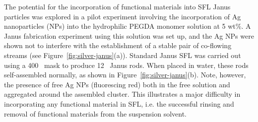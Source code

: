 The potential for the incorporation of functional materials into SFL Janus particles was 
explored in a pilot experiment involving the incorporation of Ag nanoparticles (NPs) into the
hydrophilic PEGDA monomer solution at 5 wt\%. A Janus fabrication experiment using this 
solution was set up, and the Ag NPs were shown not to interfere with the establishment of a stable
pair of co-flowing streams (see Figure~\ref{fig:silver-janus}(a)). Standard Janus SFL was carried
out using a 400 \microns~mask to produce 12 \microns~Janus rods. When placed in water, these rods
self-assembled normally, as shown in Figure~\ref{fig:silver-janus}(b).  Note, however, the presence of
free Ag NPs (fluorescing red) both in the free solution and aggregated around the assembled cluster.
This illustrates a major difficulty in incorporating any functional material in SFL, i.e. the successful 
rinsing and removal of functional materials from the suspension solvent.

